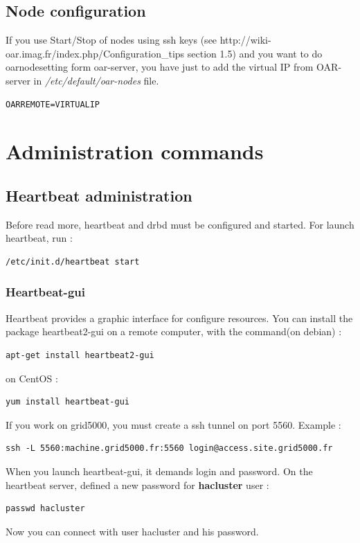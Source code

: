 \documentclass[a4paper,10pt]{report}
\begin{document}
\subsection{Node configuration}
\label{nodeconf}
If you use Start/Stop of nodes using ssh keys (see http://wiki-oar.imag.fr/index.php/Configuration\_tips section 1.5) and you want to do oarnodesetting form oar-server, 
you have just to add the virtual IP from OAR-server in \textit{/etc/default/oar-nodes} file.
\begin{lstlisting}
OARREMOTE=VIRTUALIP
\end{lstlisting}

\section{Administration commands}

\subsection{Heartbeat administration}

Before read more, heartbeat and drbd must be configured and started. For launch heartbeat, run :
\begin{lstlisting}
/etc/init.d/heartbeat start
\end{lstlisting}


\subsubsection{Heartbeat-gui}


Heartbeat provides a graphic interface for configure resources. You can install the package heartbeat2-gui on a remote computer, with the command(on debian) :
\begin{lstlisting}
apt-get install heartbeat2-gui
\end{lstlisting}
on CentOS :
\begin{lstlisting}
yum install heartbeat-gui
\end{lstlisting}
If you work on grid5000, you must create a ssh tunnel on port 5560. Example :
\begin{lstlisting}
ssh -L 5560:machine.grid5000.fr:5560 login@access.site.grid5000.fr
\end{lstlisting}
When you launch heartbeat-gui, it demands login and password. On the heartbeat server, defined a new password for \textbf{hacluster} user :
\begin{lstlisting}
passwd hacluster
\end{lstlisting}
Now you can connect with user hacluster and his password.\\
\end{document}
